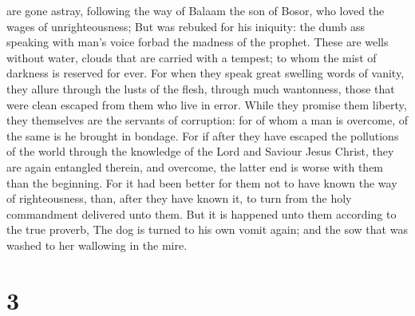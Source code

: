 are gone astray, following the way of Balaam the son of Bosor, who loved
the wages of unrighteousness;  But was rebuked for his
iniquity: the dumb ass speaking with man's voice forbad the madness of
the prophet.  These are wells without water, clouds that
are carried with a tempest; to whom the mist of darkness is reserved for
ever.  For when they speak great swelling words of
vanity, they allure through the lusts of the flesh, through much
wantonness, those that were clean escaped from them who live in error.
 While they promise them liberty, they themselves are the
servants of corruption: for of whom a man is overcome, of the same is he
brought in bondage.  For if after they have escaped the
pollutions of the world through the knowledge of the Lord and Saviour
Jesus Christ, they are again entangled therein, and overcome, the latter
end is worse with them than the beginning.  For it had
been better for them not to have known the way of righteousness, than,
after they have known it, to turn from the holy commandment delivered
unto them.  But it is happened unto them according to the
true proverb, The dog is turned to his own vomit again; and the sow that
was washed to her wallowing in the mire.

\hypertarget{section-2}{%
\section{3}\label{section-2}}

